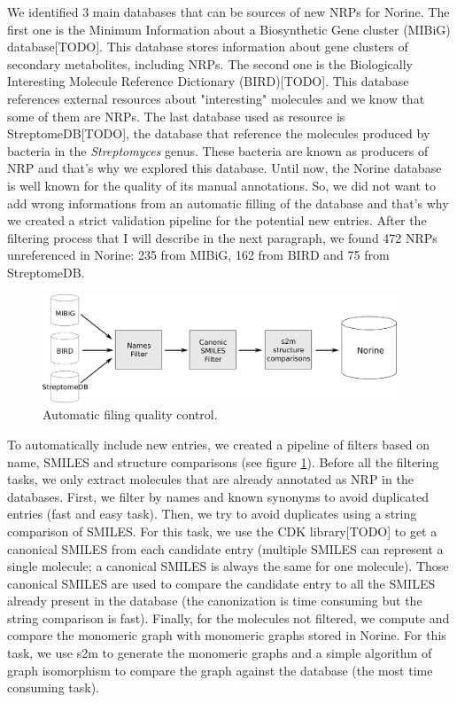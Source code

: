 \documentclass[long, final]{jobim2017}
\begin{document}
We identified 3 main databases that can be sources of new NRPs for Norine.
The first one is the Minimum Information about a Biosynthetic Gene cluster (MIBiG) database[TODO].
This database stores information about gene clusters of secondary metabolites, including NRPs.
The second one is the Biologically Interesting Molecule Reference Dictionary (BIRD)[TODO].
This database references external resources about "interesting" molecules and we know that some of them are NRPs.
The last database used as resource is StreptomeDB[TODO], the database that reference the molecules produced by bacteria in the \textit{Streptomyces} genus.
These bacteria are known as producers of NRP and that's why we explored this database.
Until now, the Norine database is well known for the quality of its manual annotations.
So, we did not want to add wrong informations from an automatic filling of the database and that's why we created a strict validation pipeline for the potential new entries.
After the filtering process that I will describe in the next paragraph, we found 472 NRPs unreferenced in Norine: 235 from MIBiG, 162 from BIRD and 75 from StreptomeDB.

 \begin{figure}
   \begin{center}
     \includegraphics[width=400px]{figs/filters.png}
   \end{center}
   \caption{Automatic filing quality control.}
   \label{fig:quality}
 \end{figure}

To automatically include new entries, we created a pipeline of filters based on name, SMILES and structure comparisons (see figure \ref{fig:quality}).
Before all the filtering tasks, we only extract molecules that are already annotated as NRP in the databases.
First, we filter by names and known synonyms to avoid duplicated entries (fast and easy task).
Then, we try to avoid duplicates using a string comparison of SMILES.
For this task, we use the CDK library[TODO] to get a canonical SMILES from each candidate entry (multiple SMILES can represent a single molecule; a canonical SMILES is always the same for one molecule).
Those canonical SMILES are used to compare the candidate entry to all the SMILES already present in the database (the canonization is time consuming but the string comparison is fast).
Finally, for the molecules not filtered, we compute and compare the monomeric graph with monomeric graphs stored in Norine.
For this task, we use s2m to generate the monomeric graphs and a simple algorithm of graph isomorphism to compare the graph against the database (the most time consuming task).
\end{document}
